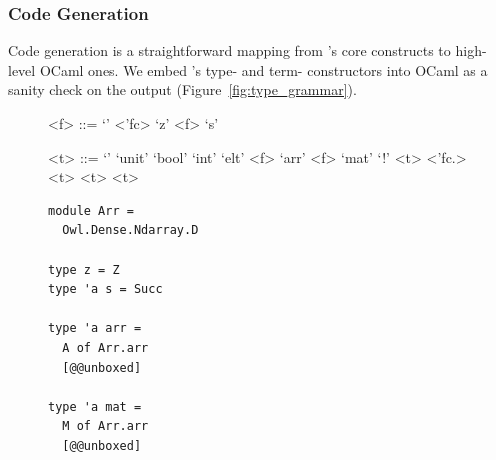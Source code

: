 \subsubsection{Code Generation}

Code generation is a straightforward mapping from \lang's core constructs to
high-level OCaml ones. We embed \lang's type- and term- constructors into OCaml
as a sanity check on the output (Figure~\ref{fig:type_grammar}).

\begin{figure}[t]
    \centering
    \begin{minipage}{.3\textwidth}
        \centering
        \begin{grammar}
            <f> ::= `'
            \alt <'fc>
            \alt `z'
            \alt <f> `s'

            <t> ::= `'
            \alt `unit'
            \alt `bool'
            \alt `int'
            \alt `elt'
            \alt <f> `arr'
            \alt <f> `mat'
            \alt `!' <t>
            \alt <'fc.> <t>
            \alt <t> \lit{$\otimes$} 
            \alt <t> \lit{$\multimap$} 
        \end{grammar}
    \end{minipage}
    \begin{minipage}{.3\textwidth}
        \centering
        \begin{verbatim}
module Arr =
  Owl.Dense.Ndarray.D

type z = Z
type 'a s = Succ

type 'a arr =
  A of Arr.arr
  [@@unboxed]

type 'a mat =
  M of Arr.arr
  [@@unboxed]


\end{verbatim}
\end{minipage}
\end{figure}

